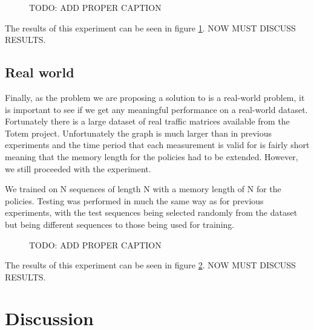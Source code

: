 \begin{figure}
    \centering
%    
    \caption{TODO: ADD PROPER CAPTION}
    \label{fig:exp_graphs}
\end{figure}

The results of this experiment can be seen in figure \ref{fig:exp_graphs}. NOW MUST DISCUSS RESULTS.

\subsection{Real world}
Finally, as the problem we are proposing a solution to is a real-world problem, it is important to see if we get any meaningful performance on a real-world dataset. Fortunately there is a large dataset of real traffic matrices available from the Totem\cite{uhlig2006providing} project. Unfortunately the graph is much larger than in previous experiments and the time period that each measurement is valid for is fairly short meaning that the memory length for the policies had to be extended. However, we still proceeded with the experiment.

We trained on N sequences of length N with a memory length of N for the policies. Testing was performed in much the same way as for previous experiments, with the test sequences being selected randomly from the dataset but being different sequences to those being used for training.

\begin{figure}
    \centering
%    
    \caption{TODO: ADD PROPER CAPTION}
    \label{fig:exp_real}
\end{figure}

The results of this experiment can be seen in figure \ref{fig:exp_real}. NOW MUST DISCUSS RESULTS.

\section{Discussion}

